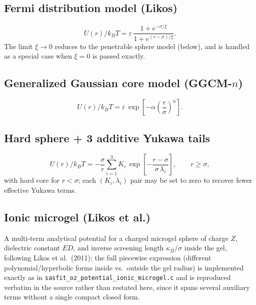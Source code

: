 \documentclass[11pt,a4paper]{article}
\newcommand{\code}[1]{\texttt{#1}}
\begin{document}
\subsection{Fermi distribution model (Likos)}
\begin{equation}
  U(r)/k_BT = \varepsilon\,\frac{1+e^{-\sigma/\xi}}{1+e^{(r-\sigma)/\xi}}.
\end{equation}
The limit $\xi\to0$ reduces to the penetrable sphere model (below), and is
handled as a special case when $\xi=0$ is passed exactly.

\subsection{Generalized Gaussian core model (GGCM-$n$)}
\begin{equation}
  U(r)/k_BT = \varepsilon\,\exp\!\left[-\alpha\left(\frac{r}{\sigma}\right)^{n}\right].
\end{equation}

\subsection{Hard sphere + 3 additive Yukawa tails}
\begin{equation}
  U(r)/k_BT = -\frac{\sigma}{r}\sum_{i=1}^{3} K_i\,\exp\!\left[-\frac{r-\sigma}{\sigma\,\lambda_i}\right], \qquad r\ge\sigma,
\end{equation}
with hard core for $r<\sigma$; each $(K_i,\lambda_i)$ pair may be set to zero to
recover fewer effective Yukawa terms.

\subsection{Ionic microgel (Likos et al.)}
A multi-term analytical potential for a charged microgel sphere of charge $Z$,
dielectric constant $ED$, and inverse screening length $\kappa_\Pi/\sigma$
inside the gel, following Likos et al.\ (2011); the full piecewise expression
(different polynomial/hyperbolic forms inside vs.\ outside the gel radius) is
implemented exactly as in \code{sasfit\_oz\_potential\_ionic\_microgel.c} and is
reproduced verbatim in the source rather than restated here, since it spans
several auxiliary terms without a single compact closed form.
\end{document}
